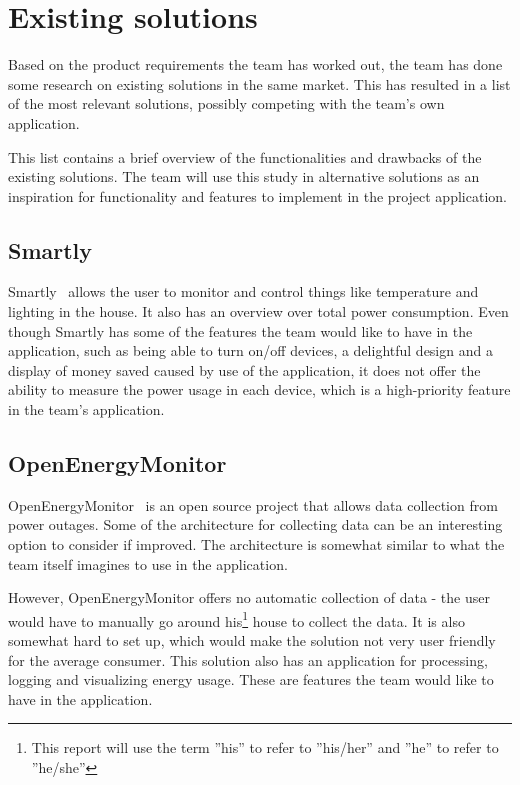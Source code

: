 \section{Existing solutions}
\label{sec:altsolution}
Based on the product requirements the team has worked out, the team has done some research on existing solutions in the same market. This has resulted in a list of the most relevant solutions, possibly competing with the team's own application.
 
This list contains a brief overview of the functionalities and drawbacks of the existing solutions. The team will use this study in alternative solutions as an inspiration for functionality and features to implement in the project application.

\subsection{Smartly}

Smartly~\cite{smartly} allows the user to monitor and control things like temperature and lighting in the house. It also has an overview over total power consumption. Even though Smartly has some of the features the team would like to have in the application, such as being able to turn on/off devices, a delightful design and a display of money saved caused by use of the application, it does not offer the ability to measure the power usage in each device, which is a high-priority feature in the team's application.

\subsection{OpenEnergyMonitor}

OpenEnergyMonitor~\cite{openenergymonitor} is an open source project that allows data collection from power outages. Some of the architecture for collecting data can be an interesting option to consider if improved. The architecture is somewhat similar to what the team itself imagines to use in the application. 

However, OpenEnergyMonitor offers no automatic collection of data - the user would have to manually go around his\footnote{This report will use the term ''his'' to refer to ''his/her'' and ''he'' to refer to ''he/she''} house to collect the data. It is also somewhat hard to set up, which would make the solution not very user friendly for the average consumer. This solution also has an application for processing, logging and visualizing energy usage. These are features the team would like to have in the application.


